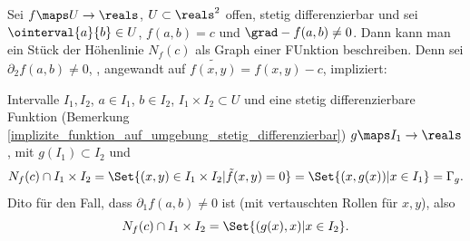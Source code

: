 \begin{folgerung}\label{satz_von_der_impliziten_funktion:hoehenlinie_folgerung}
  Sei \( f\maps U\to \reals \), \( U\subset \reals^2 \) offen, stetig differenzierbar und sei \( \ointerval{a}{b}\in U \), \( f(a,b)=c \) und \( \grad-{f(a,b)}\neq 0 \). Dann kann man ein Stück der Höhenlinie \( N_f(c) \) als Graph einer FUnktion beschreiben. Denn sei \( \partial_2 f(a,b)\neq 0 \), ,  angewandt auf \( \tilde{f(x,y)}=f(x,y)-c \), impliziert:

  \texists Intervalle \( I_1,I_2 \), \( a\in I_1 \), \( b\in I_2 \), \( I_1\times I_2\subset U \) und eine stetig differenzierbare Funktion (Bemerkung \ref{implizite_funktion_auf_umgebung_stetig_differenzierbar}) \( g\maps I_1\to \reals \), mit \( g(I_1)\subset I_2 \) und
  \begin{multline*}
    N_f(c)\cap I_1\times I_2=\Set{(x,y)\in I_1\times I_2|\tilde{f}(x,y)=0}=\Set{(x,g(x))|x\in I_1}=\Gamma_g.
  \end{multline*}
  Dito für den Fall, dass \( \partial_1 f(a,b)\neq 0 \) ist (mit vertauschten Rollen für \( x, y \)), also
  \begin{equation*}
    N_f(c)\cap I_1\times I_2=\Set{(g(x),x)|x\in I_2}.
  \end{equation*}
\end{folgerung}
